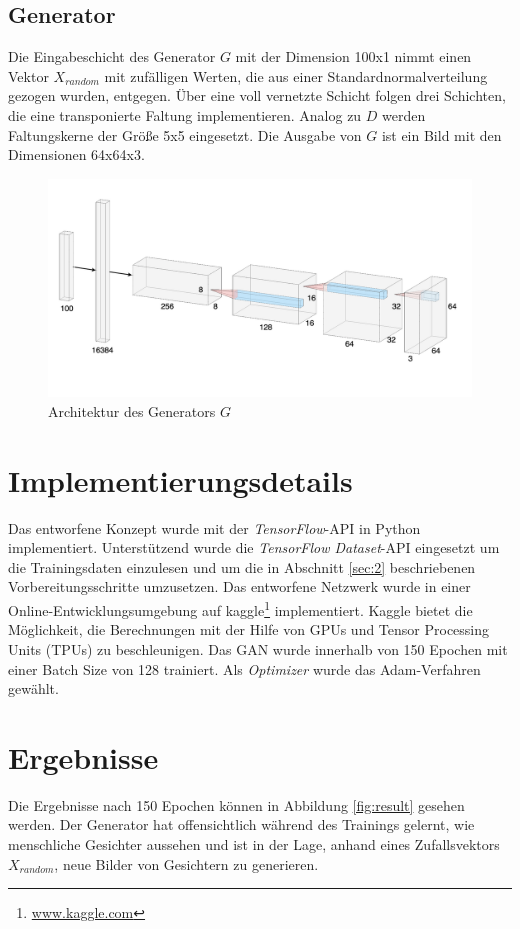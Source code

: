 \documentclass[twocolumn,10pt]{asme2ej}
\begin{document}
\subsection{Generator}
Die Eingabeschicht des Generator $G$ mit der Dimension 100x1 nimmt einen Vektor $X_{random}$ mit zufälligen Werten, die aus einer Standardnormalverteilung gezogen wurden, entgegen. Über eine voll vernetzte Schicht folgen drei Schichten, die eine transponierte Faltung implementieren. Analog zu $D$ werden Faltungskerne der Größe 5x5 eingesetzt. Die Ausgabe von $G$ ist ein Bild mit den Dimensionen 64x64x3.
\begin{figure}[h]
	\includegraphics[scale=0.12]{gen.png}
	\caption[center]{Architektur des Generators $G$ }
	\label{fig:gen}
\end{figure}


\section{Implementierungsdetails}
Das entworfene Konzept wurde mit der \emph{TensorFlow}-API \cite{tensorflow2015-whitepaper} in Python implementiert. Unterstützend wurde die \emph{TensorFlow Dataset}-API eingesetzt um die Trainingsdaten einzulesen und um die in Abschnitt \ref{sec:2} beschriebenen Vorbereitungsschritte umzusetzen.  Das entworfene Netzwerk wurde in einer Online-Entwicklungsumgebung auf kaggle\footnote{\url{www.kaggle.com}} implementiert. Kaggle bietet die Möglichkeit, die Berechnungen mit der Hilfe von GPUs und Tensor Processing Units (TPUs) zu beschleunigen. Das GAN wurde innerhalb von 150 Epochen mit einer Batch Size von 128 trainiert. Als \emph{Optimizer} wurde das Adam-Verfahren \cite{kingma2014method} gewählt.

\section{Ergebnisse}
Die Ergebnisse nach 150 Epochen können in Abbildung \ref{fig:result} gesehen werden. Der Generator hat offensichtlich während des Trainings gelernt, wie menschliche Gesichter aussehen und ist in der Lage, anhand eines Zufallsvektors $X_{random}$, neue Bilder von Gesichtern zu generieren.
\end{document}
